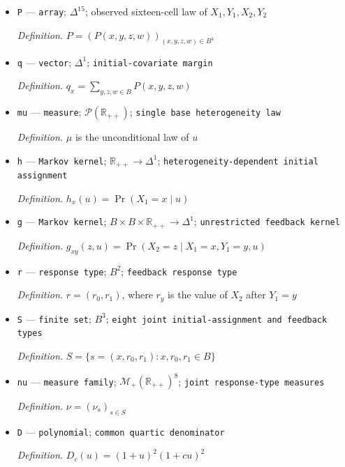 \documentclass{article}
\begin{document}
\begin{itemize}
  \par\smallskip\noindent\emph{Definition.} \(p_x(y,u)=(c^x u)^y/(1+c^x u)\)
  \item \texttt{P} --- \texttt{array}; \(\Delta^{15}\); observed sixteen-cell law of \(X_1,Y_1,X_2,Y_2\)
  \par\smallskip\noindent\emph{Definition.} \(P=(P(x,y,z,w))_{(x,y,z,w)\in B^4}\)
  \item \texttt{q} --- \texttt{vector}; \(\Delta^1\); \texttt{initial-\allowbreak{}covariate margin}
  \par\smallskip\noindent\emph{Definition.} \(q_x=\sum_{y,z,w\in B}P(x,y,z,w)\)
  \item \texttt{mu} --- \texttt{measure}; \(\mathcal P(\mathbb R_{++})\); \texttt{single base heterogeneity law}
  \par\smallskip\noindent\emph{Definition.} \(\mu\) is the unconditional law of \(u\)
  \item \texttt{h} --- \texttt{Markov kernel}; \(\mathbb R_{++}\to\Delta^1\); \texttt{heterogeneity-\allowbreak{}dependent initial assignment}
  \par\smallskip\noindent\emph{Definition.} \(h_x(u)=\Pr(X_1=x\mid u)\)
  \item \texttt{g} --- \texttt{Markov kernel}; \(B\times B\times\mathbb R_{++}\to\Delta^1\); \texttt{unrestricted feedback kernel}
  \par\smallskip\noindent\emph{Definition.} \(g_{xy}(z,u)=\Pr(X_2=z\mid X_1=x,Y_1=y,u)\)
  \item \texttt{r} --- \texttt{response type}; \(B^2\); \texttt{feedback response type}
  \par\smallskip\noindent\emph{Definition.} \(r=(r_0,r_1)\), where \(r_y\) is the value of \(X_2\) after \(Y_1=y\)
  \item \texttt{S} --- \texttt{finite set}; \(B^3\); \texttt{eight joint initial-\allowbreak{}assignment and feedback types}
  \par\smallskip\noindent\emph{Definition.} \(S=\{s=(x,r_0,r_1):x,r_0,r_1\in B\}\)
  \item \texttt{nu} --- \texttt{measure family}; \(\mathcal M_+(\mathbb R_{++})^8\); \texttt{joint response-\allowbreak{}type measures}
  \par\smallskip\noindent\emph{Definition.} \(\nu=(\nu_s)_{s\in S}\)
  \item \texttt{D} --- \texttt{polynomial}; \texttt{common quartic denominator}
  \par\smallskip\noindent\emph{Definition.} \(D_c(u)=(1+u)^2(1+cu)^2\)

\end{itemize}
\end{document}
